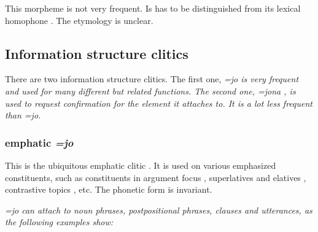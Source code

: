  
% 


This morpheme is not very frequent. Is has to be distinguished from its lexical homophone . The etymology is unclear.

\subsection{Information structure clitics}\label{sec:morph:Focusclitics}
There are two information structure clitics. The first one, \em =jo \em is very frequent and used for many different but related functions. The second one, \em =jona \em {}, is used to request confirmation for the element it attaches to. It is a lot less frequent than \em =jo\em.

\subsubsection{emphatic \em =jo\em}\label{sec:morph:=jo}
This  is the ubiquitous emphatic clitic \citep[cf.][143]{Bakker2006}. It is used on various emphasized constituents, such as constituents in argument focus , superlatives  and elatives , contrastive topics , etc. The phonetic form is invariant.

\em =jo \em can attach to noun phrases, postpositional phrases, clauses and utterances, as the following examples show:


